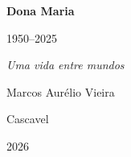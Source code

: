 \thispagestyle{empty}
\begin{center}
    \vspace*{\fill}

    {\fontsize{26}{30}\selectfont\bfseries Dona Maria\par}

    \vspace{10pt}

    {\large 1950--2025\par}

    \vspace{24pt}

    {\large\itshape Uma vida entre mundos\par}

    \vspace{36pt}

    {\normalsize Marcos Aurélio Vieira\par}

    \vspace*{\fill}

    {\normalsize Cascavel\par}
    {\normalsize 2026\par}
\end{center}

\cleardoublepage
